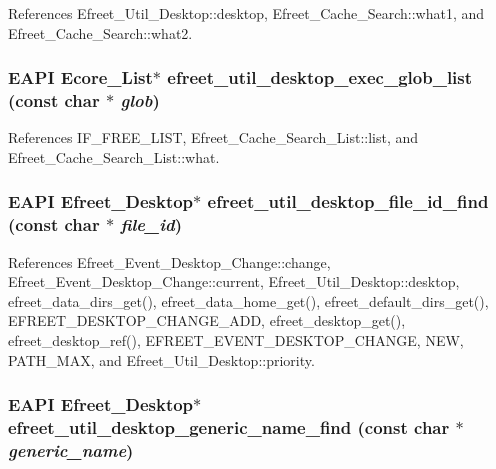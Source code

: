 References Efreet\_\-Util\_\-Desktop::desktop, Efreet\_\-Cache\_\-Search::what1, and Efreet\_\-Cache\_\-Search::what2.
\subsubsection{\setlength{\rightskip}{0pt plus 5cm}EAPI Ecore\_\-List$\ast$ efreet\_\-util\_\-desktop\_\-exec\_\-glob\_\-list (const char $\ast$ {\em glob})}\label{efreet__utils_8c_7c89ed2bc708f7be50910457399fe5e6}




References IF\_\-FREE\_\-LIST, Efreet\_\-Cache\_\-Search\_\-List::list, and Efreet\_\-Cache\_\-Search\_\-List::what.
\subsubsection{\setlength{\rightskip}{0pt plus 5cm}EAPI {\bf Efreet\_\-Desktop}$\ast$ efreet\_\-util\_\-desktop\_\-file\_\-id\_\-find (const char $\ast$ {\em file\_\-id})}\label{efreet__utils_8c_151ee6458631eeaf609a337325b7edee}




References Efreet\_\-Event\_\-Desktop\_\-Change::change, Efreet\_\-Event\_\-Desktop\_\-Change::current, Efreet\_\-Util\_\-Desktop::desktop, efreet\_\-data\_\-dirs\_\-get(), efreet\_\-data\_\-home\_\-get(), efreet\_\-default\_\-dirs\_\-get(), EFREET\_\-DESKTOP\_\-CHANGE\_\-ADD, efreet\_\-desktop\_\-get(), efreet\_\-desktop\_\-ref(), EFREET\_\-EVENT\_\-DESKTOP\_\-CHANGE, NEW, PATH\_\-MAX, and Efreet\_\-Util\_\-Desktop::priority.
\subsubsection{\setlength{\rightskip}{0pt plus 5cm}EAPI {\bf Efreet\_\-Desktop}$\ast$ efreet\_\-util\_\-desktop\_\-generic\_\-name\_\-find (const char $\ast$ {\em generic\_\-name})}\label{efreet__utils_8c_3600f55c83919cf98aeb48dea4c3c571}




